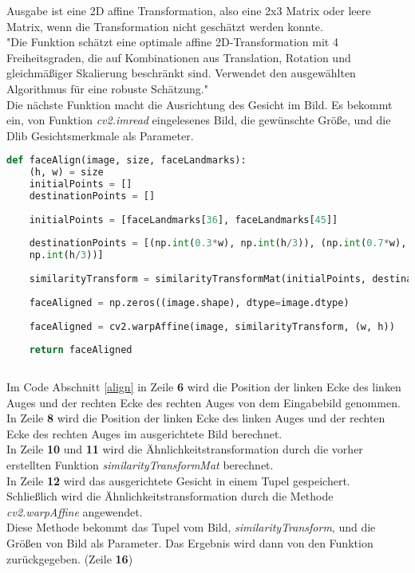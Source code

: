 \begin{flushleft}
	Ausgabe ist eine 2D affine Transformation, also eine 2x3 Matrix oder leere
	Matrix, wenn die Transformation nicht geschätzt werden konnte.\\
	"Die Funktion schätzt eine optimale affine 2D-Transformation mit 4
	Freiheitsgraden, die auf Kombinationen aus Translation, Rotation und
	gleichmäßiger Skalierung beschränkt sind. Verwendet den ausgewählten Algorithmus
	für eine robuste Schätzung."\cite{opencv_library}
	\\
	
	Die nächste Funktion macht die Ausrichtung des Gesicht im Bild. 
	Es bekommt ein, von Funktion \textit{cv2.imread} eingelesenes Bild, die
	gewünschte Größe, und die Dlib Gesichtsmerkmale als Parameter. 
	
	\begin{lstlisting}[caption=Gesichtsausrichtung,label=align,language=python]
	def faceAlign(image, size, faceLandmarks):
	(h, w) = size
	initialPoints = []
	destinationPoints = []
	
	initialPoints = [faceLandmarks[36], faceLandmarks[45]]
	
	destinationPoints = [(np.int(0.3*w), np.int(h/3)), (np.int(0.7*w),
	np.int(h/3))]
	
	similarityTransform = similarityTransformMat(initialPoints, destinationPoints)
	
	faceAligned = np.zeros((image.shape), dtype=image.dtype)
	
	faceAligned = cv2.warpAffine(image, similarityTransform, (w, h))
	
	return faceAligned
	
	\end{lstlisting}
	
	Im Code Abschnitt \ref{align} in Zeile \textbf{6} wird die Position der linken
	Ecke des linken Auges und der rechten Ecke des rechten Auges von dem Eingabebild
	genommen. \\
	In Zeile \textbf{8} wird die Position der linken Ecke des linken Auges und der
	rechten Ecke des rechten Auges im ausgerichtete Bild berechnet. \\
	In Zeile \textbf{10} und \textbf{11} wird die Ähnlichkeitstransformation durch
	die vorher erstellten Funktion \textit{similarityTransformMat} berechnet.\\
	In Zeile \textbf{12} wird das ausgerichtete Gesicht in einem Tupel gespeichert.
	\\
	Schließlich wird die Ähnlichkeitstransformation durch die Methode
	\textit{cv2.warpAffine} angewendet.\\
	Diese Methode bekommt das Tupel vom Bild, \textit{similarityTransform}, und die
	Größen von Bild als Parameter. Das Ergebnis wird dann von den Funktion
	zurückgegeben. (Zeile \textbf{16}) 
	\\
	

\end{flushleft}
